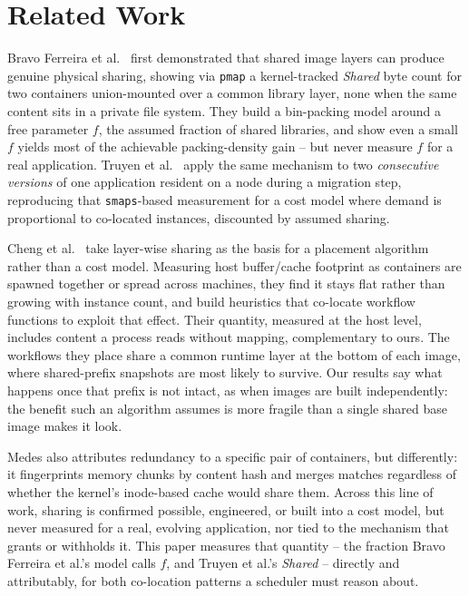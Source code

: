 \documentclass[sigplan,10pt,natbib=false]{acmart}
\begin{document}
\section{Related Work}
\label{sec:related-work}

Bravo Ferreira et al.\ \cite{bravo2017more} first demonstrated that
shared image layers can produce genuine physical sharing, showing via
\texttt{pmap} a kernel-tracked \emph{Shared} byte count for two
containers union-mounted over a common library layer, none when the
same content sits in a private file system. They build a bin-packing
model around a free parameter $f$, the assumed fraction of shared
libraries, and show even a small $f$ yields most of the achievable
packing-density gain -- but never measure $f$ for a real application.
Truyen et al.\ \cite{truyen2020flexible} apply the same mechanism to
two \emph{consecutive versions} of one application resident on a node
during a migration step, reproducing that \texttt{smaps}-based
measurement for a cost model where demand is proportional to
co-located instances, discounted by assumed sharing.

Cheng et al.\ \cite{cheng2024slo} take layer-wise sharing as the basis
for a placement algorithm rather than a cost model. Measuring host
buffer/cache footprint as containers are spawned together or spread
across machines, they find it stays flat rather than growing with
instance count, and build heuristics that co-locate workflow functions
to exploit that effect. Their quantity, measured at the host level,
includes content a process reads without mapping, complementary to
ours. The workflows they place share a common runtime layer at the
bottom of each image, where shared-prefix snapshots are most likely to
survive. Our results say what happens once that prefix is not intact,
as when images are built independently: the benefit such an algorithm
assumes is more fragile than a single shared base image makes it look.

Medes \cite{saxena2022medes} also attributes redundancy to a specific
pair of containers, but differently: it fingerprints memory chunks by
content hash and merges matches regardless of whether the kernel's
inode-based cache would share them. Across this line of work, sharing
is confirmed possible, engineered, or built into a cost model, but
never measured for a real, evolving application, nor tied to the
mechanism that grants or withholds it. This paper measures that
quantity -- the fraction Bravo Ferreira et al.'s model calls $f$, and
Truyen et al.'s \emph{Shared} -- directly and attributably, for both
co-location patterns a scheduler must reason about.
\end{document}
